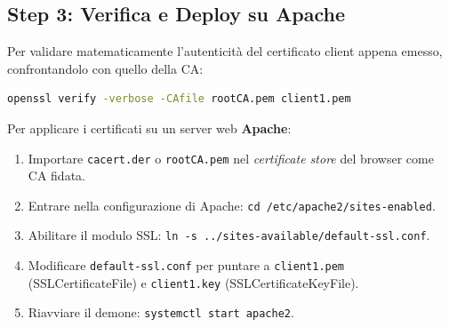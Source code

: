 \documentclass[12pt, a4paper]{report}
\begin{document}
\subsection{Step 3: Verifica e Deploy su Apache}
Per validare matematicamente l'autenticità del certificato client appena emesso, confrontandolo con quello della CA:
\begin{lstlisting}[language=bash]
	openssl verify -verbose -CAfile rootCA.pem client1.pem
\end{lstlisting}
Per applicare i certificati su un server web \textbf{Apache}:
\begin{enumerate}
	\item Importare \texttt{cacert.der} o \texttt{rootCA.pem} nel \textit{certificate store} del browser come CA fidata.
	\item Entrare nella configurazione di Apache: \texttt{cd /etc/apache2/sites-enabled}.
	\item Abilitare il modulo SSL: \texttt{ln -s ../sites-available/default-ssl.conf}.
	\item Modificare \texttt{default-ssl.conf} per puntare a \texttt{client1.pem} (SSLCertificateFile) e \texttt{client1.key} (SSLCertificateKeyFile).
	\item Riavviare il demone: \texttt{systemctl start apache2}.
\end{enumerate}
	
\end{document}
